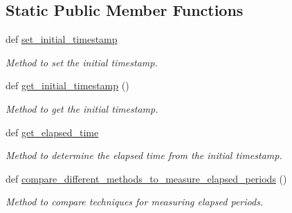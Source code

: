 \subsection*{Static Public Member Functions}
\begin{DoxyCompactItemize}
\item 
def \hyperlink{classutilities_1_1timing__measurements_1_1performance__measurement__no__ns_1_1execution__time__measurement_ac1a396608592993d871613a73d20b088}{set\+\_\+initial\+\_\+timestamp}
\begin{DoxyCompactList}\small\item\em Method to set the initial timestamp. \end{DoxyCompactList}\item 
def \hyperlink{classutilities_1_1timing__measurements_1_1performance__measurement__no__ns_1_1execution__time__measurement_af12752f53bfd297b66b504170b9e3655}{get\+\_\+initial\+\_\+timestamp} ()
\begin{DoxyCompactList}\small\item\em Method to get the initial timestamp. \end{DoxyCompactList}\item 
def \hyperlink{classutilities_1_1timing__measurements_1_1performance__measurement__no__ns_1_1execution__time__measurement_a465918aa8dcf663887149cbf9a7306b9}{get\+\_\+elapsed\+\_\+time}
\begin{DoxyCompactList}\small\item\em Method to determine the elapsed time from the initial timestamp. \end{DoxyCompactList}\item 
def \hyperlink{classutilities_1_1timing__measurements_1_1performance__measurement__no__ns_1_1execution__time__measurement_a75eea39203f4d9b779977f9203f6d745}{compare\+\_\+different\+\_\+methods\+\_\+to\+\_\+measure\+\_\+elapsed\+\_\+periods} ()
\begin{DoxyCompactList}\small\item\em Method to compare techniques for measuring elapsed periods. \end{DoxyCompactList}\end{DoxyCompactItemize}
